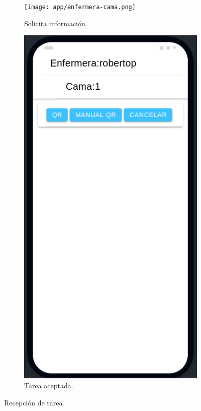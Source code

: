 \begin{figure}[!htpb]
     \hfill
     \begin{subfigure}[b]{0.3\textwidth}
         \centering
         \texttt{[image: app/enfermera-cama.png]}
         \caption{Solicita información.}
         \label{fig:2de3}
     \end{subfigure}
     \hfill
     \begin{subfigure}[b]{0.3\textwidth}
         \centering
         \includegraphics[width=.95\textwidth]{./Figures/app/yendo-enfermera.png}
         \caption{Tarea aceptada.}
         \label{fig:3de3}
     \end{subfigure}
        \caption{Recepción de tarea}
        \label{fig:three graphs}
\end{figure}

